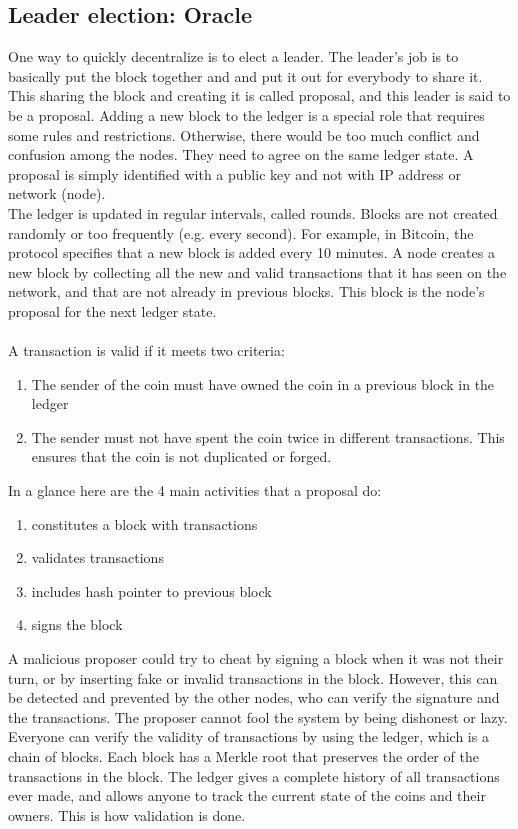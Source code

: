 \subsection{Leader election: Oracle}
One way to quickly decentralize is to elect a leader. The leader's job is to basically put the block together and and put it out for everybody to share it. This sharing the block and creating it is called proposal, and this leader is said to be a proposal. Adding a new block to the ledger is a special role that requires some rules and restrictions. Otherwise, there would be too much conflict and confusion among the nodes. They need to agree on the same ledger state. A proposal is simply identified with a public key and not with IP address or network (node).\\
The ledger is updated in regular intervals, called rounds. Blocks are not created randomly or too frequently (e.g. every second). For example, in Bitcoin, the protocol specifies that a new block is added every 10 minutes. A node creates a new block by collecting all the new and valid transactions that it has seen on the network, and that are not already in previous blocks. This block is the node’s proposal for the next ledger state.\\\\
A transaction is valid if it meets two criteria:
\begin{enumerate}
	\item The sender of the coin must have owned the coin in a previous block in the ledger
	\item The sender must not have spent the coin twice in different transactions. This ensures that the coin is not duplicated or forged.
\end{enumerate}
In a glance here are the 4 main activities that a proposal do:
\begin{enumerate}
	\item constitutes a block with transactions
	\item validates transactions
	\item includes hash pointer to previous block
	\item signs the block
\end{enumerate}
A malicious proposer could try to cheat by signing a block when it was not their turn, or by inserting fake or invalid transactions in the block. However, this can be detected and prevented by the other nodes, who can verify the signature and the transactions. The proposer cannot fool the system by being dishonest or lazy. Everyone can verify the validity of transactions by using the ledger, which is a chain of blocks. Each block has a Merkle root that preserves the order of the transactions in the block. The ledger gives a complete history of all transactions ever made, and allows anyone to track the current state of the coins and their owners. This is how validation is done.\\\\
